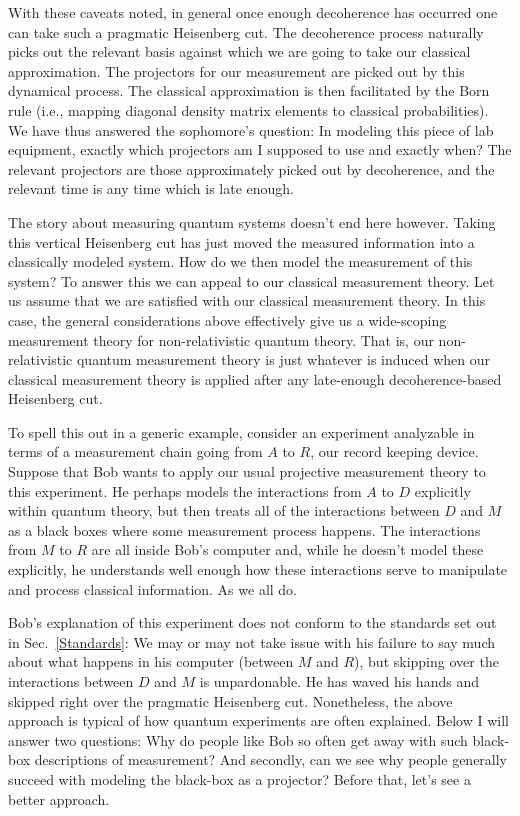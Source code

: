 \documentclass[12pt,prd,superscriptaddress,floatfix,amsmath,amssymb,amsfonts,nofootinbib]{revtex4-2}
\begin{document}
With these caveats noted, in general once enough decoherence has occurred one can take such a pragmatic Heisenberg cut. The decoherence process naturally picks out the relevant basis against which we are going to take our classical approximation. The projectors for our measurement are picked out by this dynamical process. The classical approximation is then facilitated by the Born rule (i.e., mapping diagonal density matrix elements to classical probabilities). We have thus answered the sophomore's question: In modeling this piece of lab equipment, exactly which projectors am I supposed to use and exactly when? The relevant projectors are those approximately picked out by decoherence, and the relevant time is any time which is late enough.

The story about measuring quantum systems doesn't end here however. Taking this vertical Heisenberg cut has just moved the measured information into a classically modeled system. How do we then model the measurement of this system? To answer this we can appeal to our classical measurement theory. Let us assume that we are satisfied with our classical measurement theory. In this case, the general considerations above effectively give us a wide-scoping measurement theory for non-relativistic quantum theory. That is, our non-relativistic quantum measurement theory is just whatever is induced when our classical measurement theory is applied after any late-enough decoherence-based Heisenberg cut.

To spell this out in a generic example, consider an experiment analyzable in terms of a measurement chain going from $A$ to $R$, our record keeping device. Suppose that Bob wants to apply our usual projective measurement theory to this experiment. He perhaps models the interactions from $A$ to $D$ explicitly within quantum theory, but then treats all of the interactions between $D$ and $M$ as a black boxes where some measurement process happens. The interactions from $M$ to $R$ are all inside Bob's computer and, while he doesn't model these explicitly, he understands well enough how these interactions serve to manipulate and process classical information. As we all do.

Bob's explanation of this experiment does not conform to the standards set out in Sec.~\ref{Standards}: We may or may not take issue with his failure to say much about what happens in his computer (between $M$ and $R$), but skipping over the interactions between $D$ and $M$ is unpardonable. He has waved his hands and skipped right over the pragmatic Heisenberg cut. Nonetheless, the above approach is typical of how quantum experiments are often explained. Below I will answer two questions: Why do people like Bob so often get away with such black-box descriptions of measurement? And secondly, can we see why people generally succeed with modeling the black-box as a projector? Before that, let's see a better approach. 
\end{document}
